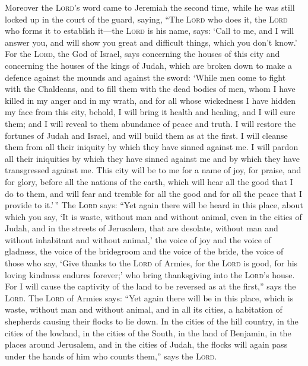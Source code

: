  Moreover the \textsc{Lord}'s word came to Jeremiah the
second time, while he was still locked up in the court of the guard,
saying,  ``The \textsc{Lord} who does it, the
\textsc{Lord} who forms it to establish it---the \textsc{Lord} is his
name, says:  `Call to me, and I will answer you, and will
show you great and difficult things, which you don't know.'
 For the \textsc{Lord}, the God of Israel, says concerning
the houses of this city and concerning the houses of the kings of Judah,
which are broken down to make a defence against the mounds and against
the sword:  `While men come to fight with the Chaldeans,
and to fill them with the dead bodies of men, whom I have killed in my
anger and in my wrath, and for all whose wickedness I have hidden my
face from this city,  behold, I will bring it health and
healing, and I will cure them; and I will reveal to them abundance of
peace and truth.  I will restore the fortunes of Judah and
Israel, and will build them as at the first.  I will
cleanse them from all their iniquity by which they have sinned against
me. I will pardon all their iniquities by which they have sinned against
me and by which they have transgressed against me.  This
city will be to me for a name of joy, for praise, and for glory, before
all the nations of the earth, which will hear all the good that I do to
them, and will fear and tremble for all the good and for all the peace
that I provide to it.'\,''  The \textsc{Lord} says: ``Yet
again there will be heard in this place, about which you say, `It is
waste, without man and without animal, even in the cities of Judah, and
in the streets of Jerusalem, that are desolate, without man and without
inhabitant and without animal,'  the voice of joy and the
voice of gladness, the voice of the bridegroom and the voice of the
bride, the voice of those who say, `Give thanks to the \textsc{Lord} of
Armies, for the \textsc{Lord} is good, for his loving kindness endures
forever;' who bring thanksgiving into the \textsc{Lord}'s house. For I
will cause the captivity of the land to be reversed as at the first,''
says the \textsc{Lord}.  The \textsc{Lord} of Armies
says: ``Yet again there will be in this place, which is waste, without
man and without animal, and in all its cities, a habitation of shepherds
causing their flocks to lie down.  In the cities of the
hill country, in the cities of the lowland, in the cities of the South,
in the land of Benjamin, in the places around Jerusalem, and in the
cities of Judah, the flocks will again pass under the hands of him who
counts them,'' says the \textsc{Lord}.

